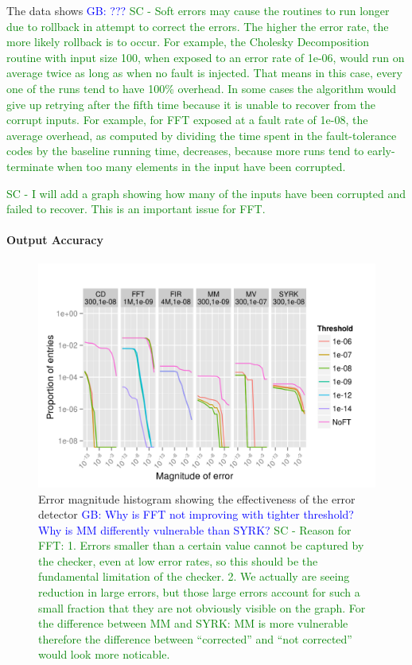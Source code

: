 \documentclass{sig-alternate}
\newcommand{\sui}[1]{%
  \textcolor{green}{SC - #1}
}
\newcommand{\greg}[1]{%
  \textcolor{blue}{GB: #1}
}
\begin{document}
The data shows \greg{???} \sui{Soft errors may cause the routines to run longer due to rollback in attempt to correct the errors. The higher the error rate, the more likely rollback is to occur. For example, the Cholesky Decomposition routine with input size 100, when exposed to an error rate of 1e-06, would run on average twice as long as when no fault is injected. That means in this case, every one of the runs tend to have 100\% overhead. In some cases the algorithm would give up retrying after the fifth time because it is unable to recover from the corrupt inputs. For example, for FFT exposed at a fault rate of 1e-08, the average overhead, as computed by dividing the time spent in the fault-tolerance codes by the baseline running time, decreases, because more runs tend to early-terminate when too many elements in the input have been corrupted.}

\sui{I will add a graph showing how many of the inputs have been corrupted and failed to recover. This is an important issue for FFT.}

\paragraph{Output Accuracy}

\begin{figure}[ht!]
\centering
\includegraphics[width=1.00\columnwidth]{figs/4_1_1_Exp2_1_Example.png}
\caption{Error magnitude histogram showing the effectiveness of the error detector \greg{Why is FFT not improving with tighter threshold? Why is MM differently vulnerable than SYRK?} \sui{Reason for FFT: 1. Errors smaller than a certain value cannot be captured by the checker, even at low error rates, so this should be the fundamental limitation of the checker. 2. We actually are seeing reduction in large errors, but those large errors account for such a small fraction that they are not obviously visible on the graph. For the difference between MM and SYRK: MM is more vulnerable therefore the difference between ``corrected'' and ``not corrected'' would look more noticable.}}
\label{fig:algo_err_dist}
\end{figure}
\end{document}

